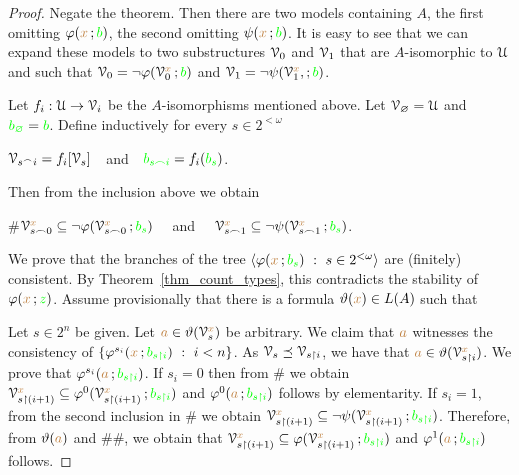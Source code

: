 \begin{proof}
  Negate the theorem.
  Then there are two models containing $A$, the first omitting $\varphi({\color{brown} x}\,;{\color{green} b})$, the second omitting $\psi({\color{brown} x}\,;{\color{green} b})$.
  It is easy to see that we can expand these models to two substructures $\EuScript V_0$ and $\EuScript V_1$ that are $A$-isomorphic to $\EuScript U$ and such that $\EuScript V_0=\neg\varphi(\EuScript V_0^{{\color{brown} x}}\,;{\color{green} b})$ and $\EuScript V_1=\neg\psi(\EuScript V_1^{{\color{brown} x}},;{\color{green} b})$.

  Let $f_i:\EuScript U\to\EuScript V_i$ be the $A$-isomorphisms mentioned above. 
  Let $\EuScript V_\varnothing=\EuScript U$ and ${\color{green} b_\varnothing}={\color{green} b}$.
  Define inductively for every $s\in 2^{<\omega}$ 

  \hfil$\EuScript V_{s^\frown i}=f_i[\EuScript V_s]$\ \ and\ \ ${\color{green} b_{s\frown i}}=f_i({\color{green} b_s})$.

  Then from the inclusion above we obtain

  \#\hfil$\EuScript V_{s\frown0}^{{\color{brown} x}}\subseteq\neg\varphi(\EuScript V_{s\frown0}^{{\color{brown} x}}\,;{\color{green} b_s})$ \ \ and \ \  $\EuScript V_{s\frown1}^{{\color{brown} x}}\subseteq\neg\psi(\EuScript V_{s\frown1}^{{\color{brown} x}}\,;{\color{green} b_s})$.

  We prove that the branches of the tree $\<\phi({\mr x}\,;{\gr b_s})\ :\  s\in2^{<\omega}\>$ are (finitely) consistent. 
  By Theorem~\ref{thm_count_types}, this contradicts the stability of $\varphi({\color{brown} x}\,;{\color{green} z})$.
  Assume provisionally that there is a formula $\vartheta({\color{brown} x})\in L(A)$ such that
  
  
  Let $s\in2^n$ be given.
  Let ${\color{brown} a}\in\vartheta(\EuScript V_s^{{\color{brown} x}})$ be arbitrary. We claim that ${\color{brown} a}$ witnesses the consistency of $\{\phi^{s_i}({\mr x}\,;{\gr b_{s\restriction i}})\ :\ i<n\}$.
  As $\EuScript V_s\preceq\EuScript V_{s\restriction i}$, we have that ${\color{brown} a}\in\vartheta(\EuScript V_{s\restriction i}^{{\color{brown} x}})$.
  We prove that $\varphi^{s_i}({\color{brown} a}\,;{\color{green} b_{s\restriction i}})$.
If $s_i=0$ then from \# we obtain $\EuScript V_{s\restriction(i+1)}^{{\color{brown} x}}\subseteq\varphi^0(\EuScript V_{s\restriction(i+1)}^{{\color{brown} x}}\,;{\color{green} b_{s\restriction i}})$ and $\varphi^0({\color{brown} a}\,;{\color{green} b_{s\restriction i}})$ follows by elementarity.
  If $s_i=1$, from the second inclusion in \# we obtain $\EuScript V_{s\restriction(i+1)}^{{\color{brown} x}}\subseteq\neg\psi(\EuScript V_{s\restriction(i+1)}^{{\color{brown} x}}\,;{\color{green} b_{s\restriction i}})$.
  Therefore, from $\vartheta({\color{brown} a})$ and \#\#, we obtain that $\EuScript V_{s\restriction(i+1)}^{{\color{brown} x}}\subseteq\varphi(\EuScript V_{s\restriction(i+1)}^{{\color{brown} x}}\,;{\color{green} b_{s\restriction i}})$ and $\varphi^1({\color{brown} a}\,;{\color{green} b_{s\restriction i}})$ follows.


\end{proof}
